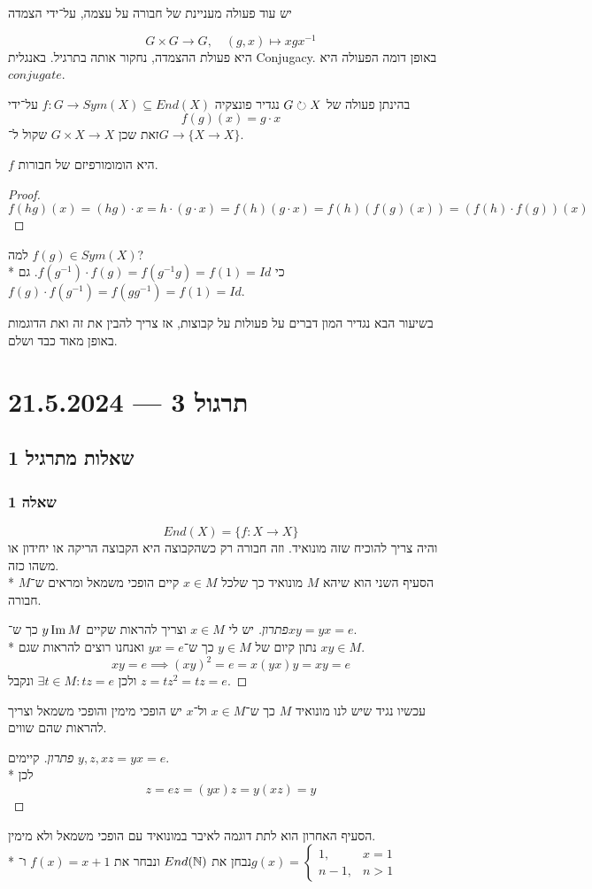 יש עוד פעולה מעניינת של חבורה על עצמה, על־ידי הצמדה
\begin{definition}[הצמדה]
	\[
		G \times G \to G, \quad (g, x) \mapsto x g x^{-1}
	\]
	היא פעולת ההצמדה, נחקור אותה בתרגיל. באנגלית Conjugacy.
	באופן דומה הפעולה היא $conjugate$.
\end{definition}

בהינתן פעולה של $G \circlearrowright X$ נגדיר פונצקיה $f : G \to Sym(X) \subseteq End(X)$ על־ידי
\[
	f(g)(x) = g \cdot x
\]
זאת שכן $G \times X \to X$ שקול ל־$G \to \{ X \to X \}$.

\begin{proposition}
	$f$ היא הומומורפיזם של חבורות.
\end{proposition}
\begin{proof}
	\[
		f(hg)(x) = (hg) \cdot x = h \cdot (g \cdot x) = f(h)(g \cdot x) = f(h)(f(g)(x)) = (f(h) \cdot f(g))(x)
	\]
\end{proof}

למה $f(g) \in Sym(X)$? \\*
כי $f(g^{-1}) \cdot f(g) = f(g^{-1} g) = f(1) = Id$.
גם $f(g) \cdot f(g^{-1}) = f(g g^{-1}) = f(1) = Id$.

בשיעור הבא נגדיר המון דברים על פעולות על קבוצות, אז צריך להבין את זה ואת הדוגמות באופן מאוד כבד ושלם.

\section{תרגול 3 --- 21.5.2024}
\subsection{שאלות מתרגיל 1}
\subsubsection{שאלה 1}
\[
	End(X) = \{ f : X \to X \}
\]
והיה צריך להוכיח שזה מונואיד. וזה חבורה רק כשהקבוצה היא הקבוצה הריקה או יחידון או משהו כזה. \\*
הסעיף השני הוא שיהא $M$ מונואיד כך שלכל $x \in M$ קיים הופכי משמאל ומראים ש־$M$ חבורה.
\begin{proof}[פתרון]
	יש לי $x \in M$ וצריך להראות שקיים $y \operatorname{Im} M$ כך ש־$xy = yx = e$. \\*
	נתון קיום של $y \in M$ כך ש־$yx = e$ ואנחנו רוצים להראות שגם $xy \in M$.
	\[
		xy = e \implies {(xy)}^2 = e = x (yx) y = xy = e
	\]
	ולכן $\exists t \in M: tz = e$ ונקבל $z = tz^2 = tz = e$.
\end{proof}
עכשיו נגיד שיש לנו מונואיד $M$ כך ש־$x \in M$ ול־$x$ יש הופכי מימין והופכי משמאל וצריך להראות שהם שווים.
\begin{proof}[פתרון]
	קיימים $y, z, xz = yx = e$. \\*
	לכן
	\[
		z = ez = (yx) z = y (xz) = y
	\]
\end{proof}
הסעיף האחרון הוא לתת דוגמה לאיבר במונואיד עם הופכי משמאל ולא מימין. \\*
נבחן את $End(\mathbb{N})$ ונבחר את $f(x) = x + 1$ ו־$g(x) = \begin{cases}
	1, & x = 1 \\
	n - 1, & n > 1
\end{cases}$

